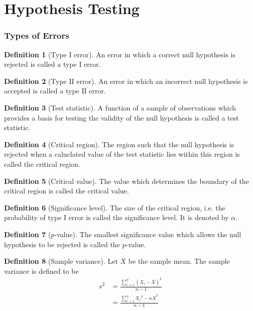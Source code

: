 \documentclass[titlepage, fleqn, a4paper, 12pt, twoside]{article}
\theoremstyle{definition}
\newtheorem{definition}{Definition}
\theoremstyle{theorem}
\begin{document}
\clearpage
\part{Hypothesis Testing}

\section{Types of Errors}

\begin{definition}[Type $\mathrm{I}$ error]
	An error in which a correct null hypothesis is rejected is called a type $\mathrm{I}$ error.
\end{definition}

\begin{definition}[Type $\mathrm{II}$ error]
	An error in which an incorrect null hypothesis is accepted is called a type $\mathrm{II}$ error.
\end{definition}

\begin{definition}[Test statistic]
	A function of a sample of observations which provides a basis for testing the validity of the null hypothesis is called a test statistic.
\end{definition}

\begin{definition}[Critical region]
	The region such that the null hypothesis is rejected when a caluclated value of the test statistic lies within this region is called the critical region.
\end{definition}

\begin{definition}[Critical value]
	The value which determines the boundary of the critical region is called the critical value.
\end{definition}

\begin{definition}[Significance level]
	The size of the critical region, i.e. the probability of type $\mathrm{I}$ error is called the significance level.
	It is denoted by $\alpha$.
\end{definition}

\begin{definition}[$p$-value]
	The smallest significance value which allows the null hypothesis to be rejected is called the $p$-value.
\end{definition}

\begin{definition}[Sample variance]
	Let $\overline{X}$ be the sample mean.
	The sample variance is defined to be
	\begin{align*}
		s^2 &= \frac{\sum\limits_{i = 1}^{n} \left( X_i - \overline{X} \right)^2}{n - 1}\\
		&= \frac{\sum\limits_{i = 1}^{n} {X_i}^2 - n \overline{X}^2}{n - 1}
	\end{align*}
\end{definition}
\end{document}
